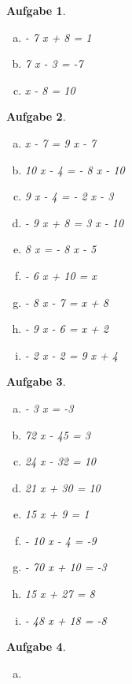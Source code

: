\documentclass[12pt,fleqn]{article}
\theoremstyle{aufg}
\newtheorem{aufgabe}{Aufgabe}
\theoremstyle{bsp}
\begin{document}
\begin{flushleft}
\begin{aufgabe}
\begin{multicols}{3}
\begin{enumerate}[a)]
- 7 x + 3 = 8
\item 
- 7 x + 8 = 1
\item 
7 x - 3 = -7
\item 
x - 8 = 10
\end{enumerate} 
\end{multicols} 
\end{aufgabe} 
\begin{aufgabe}\framebox{\qquad/} ~ \\ 
\begin{multicols}{3} 
\begin{enumerate}[a)] 
\item 
x - 7 = 9 x - 7
\item 
10 x - 4 = - 8 x - 10
\item 
9 x - 4 = - 2 x - 3
\item 
- 9 x + 8 = 3 x - 10
\item 
8 x = - 8 x - 5
\item 
- 6 x + 10 = x
\item 
- 8 x - 7 = x + 8
\item 
- 9 x - 6 = x + 2
\item 
- 2 x - 2 = 9 x + 4
\end{enumerate} 
\end{multicols} 
\end{aufgabe} 
\begin{aufgabe}\framebox{\qquad/} ~ \\ 
\begin{multicols}{3} 
\begin{enumerate}[a)] 
\item 
- 3 x = -3
\item 
72 x - 45 = 3
\item 
24 x - 32 = 10
\item 
21 x + 30 = 10
\item 
15 x + 9 = 1
\item 
- 10 x - 4 = -9
\item 
- 70 x + 10 = -3
\item 
15 x + 27 = 8
\item 
- 48 x + 18 = -8
\end{enumerate} 
\end{multicols} 
\end{aufgabe} 
\begin{aufgabe}\framebox{\qquad/} ~ \\ 
\begin{multicols}{2} 
\begin{enumerate}[a)] 
\item 

\end{enumerate}
\end{multicols}
\end{aufgabe}
\end{flushleft}
\end{document}
